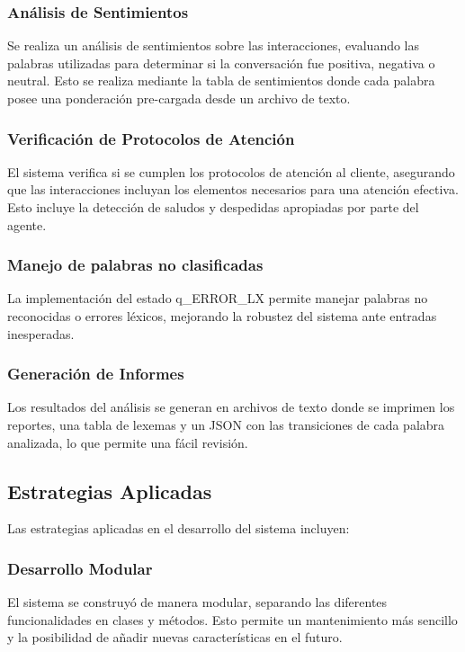 \documentclass[12pt,a4paper]{article}
\begin{document}
\subsubsection{Análisis de Sentimientos}
Se realiza un análisis de sentimientos sobre las interacciones, evaluando las palabras
utilizadas para determinar si la conversación fue positiva, negativa o neutral. Esto se realiza
mediante la tabla de sentimientos donde cada palabra posee una ponderación pre-cargada desde un
archivo de texto.

\subsubsection{Verificación de Protocolos de Atención}
El sistema verifica si se cumplen los protocolos de atención al cliente, asegurando que las
interacciones incluyan los elementos necesarios para una atención efectiva. Esto incluye la
detección de saludos y despedidas apropiadas por parte del agente.

\subsubsection{Manejo de palabras no clasificadas}
La implementación del estado q\_ERROR\_LX permite manejar palabras no reconocidas o errores
léxicos, mejorando la robustez del sistema ante entradas inesperadas.

\subsubsection{Generación de Informes}
Los resultados del análisis se generan en archivos de texto donde se imprimen los reportes, una
tabla de lexemas y un JSON con las transiciones de cada palabra analizada, lo que permite una
fácil revisión.

\subsection{Estrategias Aplicadas}
Las estrategias aplicadas en el desarrollo del sistema incluyen:

\subsubsection{Desarrollo Modular}
El sistema se construyó de manera modular, separando las diferentes funcionalidades en clases y
métodos. Esto permite un mantenimiento más sencillo y la posibilidad de añadir nuevas
características en el futuro.
\end{document}
